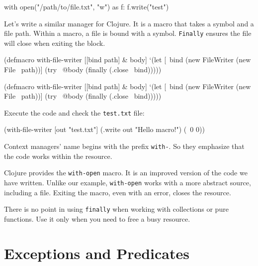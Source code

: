 
\begin{python}
with open("/path/to/file.txt", "w") as f:
    f.write("test")
\end{python}

Let's write a similar manager for Clojure. It is a macro that takes a symbol and a file path. Within a macro, a file is bound with a symbol. \verb|Finally| ensures the file will close when exiting the block.


\ifx\DEVICETYPE\MOBILE

\begin{clojure}
(defmacro with-file-writer
  [[bind path] & body]
  `(let [~bind (new FileWriter
                 (new File ~path))]
     (try
       ~@body
       (finally
         (.close ~bind)))))
\end{clojure}

\else

\begin{clojure}
(defmacro with-file-writer
  [[bind path] & body]
  `(let [~bind (new FileWriter (new File ~path))]
     (try
       ~@body
       (finally
         (.close ~bind)))))
\end{clojure}

\fi

Execute the code and check the \verb|test.txt| file:

\begin{clojure}
(with-file-writer [out "test.txt"]
  (.write out "Hello macro!")
  (\ 0 0))
\end{clojure}

Context managers' name begins with the prefix \verb|with-|. So they emphasize that the code works within the resource.


Clojure provides the \verb|with-open| macro. It is an improved version of the code we have written. Unlike our example, \verb|with-open| works with a more abstract source, including a file. Exiting the macro, even with an error, closes the resource.

There is no point in using \verb|finally| when working with collections or pure functions. Use it only when you need to free a busy resource.

\section{Exceptions and Predicates}

